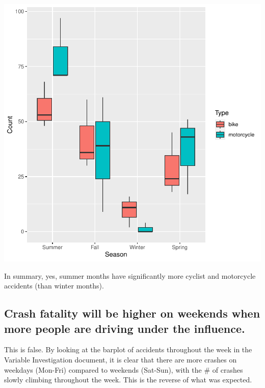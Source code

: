 \documentclass[11pt, a4paper]{article}
\begin{document}
\includegraphics{regression-047}

In summary, yes, summer months have significantly more cyclist and motorcycle accidents (than winter months). 




\pagebreak
\subsection{Crash fatality will be higher on weekends when more people are driving under the influence.} 

This is false. By looking at the barplot of accidents throughout the week in the Variable Investigation document, it is clear that there are more crashes on weekdays (Mon-Fri) compared to weekends (Sat-Sun), with the \# of crashes slowly climbing throughout the week. This is the reverse of what was expected. 
\end{document}
